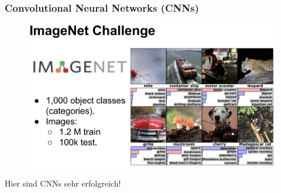 \documentclass{beamer}
\begin{document}
\begin{frame}
  \frametitle{Convolutional Neural Networks (CNNs)}
  \begin{figure}
    \centering
    \includegraphics[width=\textwidth]{img/imagenet.png}
    \caption*{ \cite{}}
  \end{figure}
  Hier sind CNNs sehr erfolgreich!
\end{frame}
\end{document}
